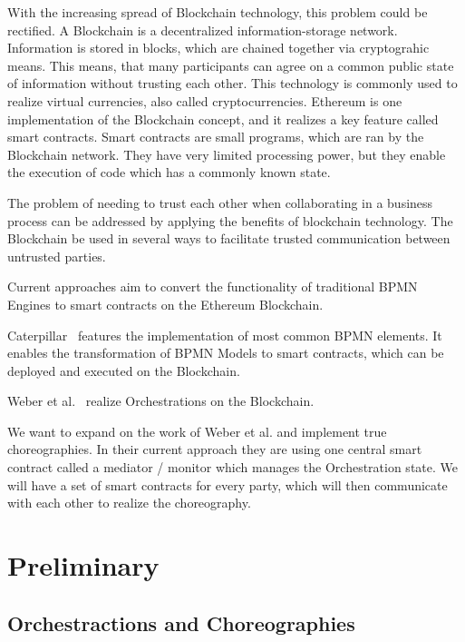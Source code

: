 \documentclass[runningheads]{llncs}
\begin{document}
With the increasing spread of Blockchain technology, this problem could be rectified.
A Blockchain is a decentralized information-storage network. Information is stored in blocks, which are chained together via cryptograhic means. This means, that many participants can agree on a common public state of information without trusting each other. This technology is commonly used to realize virtual currencies, also called cryptocurrencies.
Ethereum is one implementation of the Blockchain concept, and it realizes a key feature called smart contracts.
Smart contracts are small programs, which are ran by the Blockchain network. They have very limited processing power, but they enable the execution of code which has a commonly known state. 

The problem of needing to trust each other when collaborating in a business process can be addressed by applying the benefits of blockchain technology. The Blockchain be used in several ways to facilitate trusted communication between untrusted parties.

Current approaches aim to convert the functionality of traditional BPMN Engines to smart contracts on the Ethereum Blockchain.

Caterpillar~\cite{lopez2017caterpillar} features the implementation of most common BPMN elements. It enables the transformation of BPMN Models to smart contracts, which can be deployed and executed on the Blockchain.

Weber et al.~\cite{weber2016untrusted} realize Orchestrations on the Blockchain.

We want to expand on the work of Weber et al. and implement true choreographies. In their current approach they are using one central smart contract called a mediator / monitor which manages the Orchestration state.
We will have a set of smart contracts for every party, which will then communicate with each other to realize the choreography.

\section{Preliminary}

\subsection{Orchestractions and Choreographies}
\end{document}
